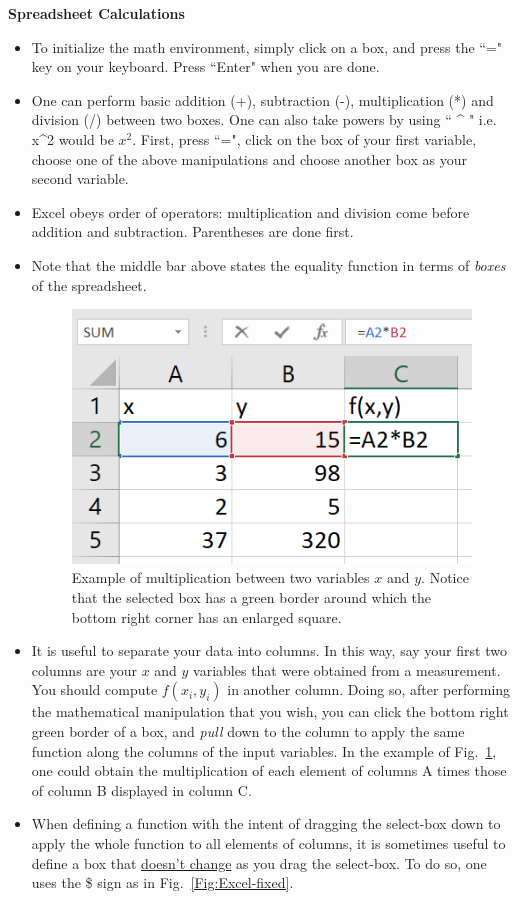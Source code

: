 \documentclass[12pt]{report}
\begin{document}
\noindent \large \textbf{Spreadsheet Calculations} \normalsize
\begin{itemize}
\item To initialize the math environment, simply click on a box, and press the ``=" key on your keyboard. Press ``Enter" when you are done.
\item One can perform basic addition (+), subtraction (-), multiplication (*) and division (/) between two boxes. One can also take powers by using `` ^ " i.e. x^2 would be $x^2$. First, press ``=", click on the box of your first variable, choose one of the above manipulations and choose another box as your second variable.
\item Excel obeys order of operators: multiplication and division come before addition and subtraction. Parentheses are done first.
\item Note that the middle bar above states the equality function in terms of \textit{boxes} of the spreadsheet.
\begin{figure}[h]
\centering
\includegraphics[width=0.4 \textwidth]{Excel-tut-boxes.png}
\caption{Example of multiplication between two variables $x$ and $y$. Notice that the selected box has a green border around which the bottom right corner has an enlarged square.}
\label{Fig:Excel-boxes}
\end{figure}
\item It is useful to separate your data into columns. In this way, say your first two columns are your $x$ and $y$ variables that were obtained from a measurement. You should compute $f(x_i, y_i)$ in another column. Doing so, after performing the mathematical manipulation that you wish, you can click the bottom right green border of a box, and \textit{pull} down to the column to apply the same function along the columns of the input variables. In the example of Fig.~\ref{Fig:Excel-boxes}, one could obtain the multiplication of each element of columns A times those of column B displayed in column C.
\item When defining a function with the intent of dragging the select-box down to apply the whole function to all elements of columns, it is sometimes useful to define a box that \underline{doesn't change} as you drag the select-box. To do so, one uses the \$ sign as in Fig.~\ref{Fig:Excel-fixed}.

\end{itemize}
\end{document}
